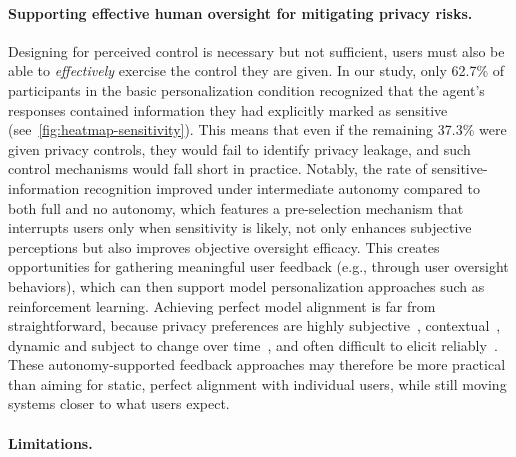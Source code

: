 \paragraph{Supporting effective human oversight for mitigating privacy risks.}
Designing for perceived control is necessary but not sufficient, users must also be able to \emph{effectively} exercise the control they are given.
In our study, only 62.7\% of participants in the basic personalization condition recognized that the agent's responses contained information they had explicitly marked as sensitive (see~\autoref{fig:heatmap-sensitivity}).
This means that even if the remaining 37.3\% were given privacy controls, they would fail to identify privacy leakage, and such control mechanisms would fall short in practice.
Notably, the rate of sensitive-information recognition improved under intermediate autonomy compared to both full and no autonomy, which features a pre-selection mechanism that interrupts users only when sensitivity is likely, not only enhances subjective perceptions but also improves objective oversight efficacy.
This creates opportunities for gathering meaningful user feedback (e.g., through user oversight behaviors), which can then support model personalization approaches such as reinforcement learning. 
Achieving perfect model alignment is far from straightforward, because privacy preferences are highly subjective~\cite{lee2025revealed}, contextual~\cite{zhang2024s}, dynamic and subject to change over time~\cite{goldfarb2012shifts}, and often difficult to elicit reliably~\cite{zhang2024privacy}. 
These autonomy-supported feedback approaches may therefore be more practical than aiming for static, perfect alignment with individual users, while still moving systems closer to what users expect.


\paragraph{Limitations.}


